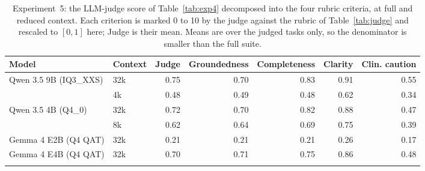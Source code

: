 \begin{table}[H]
\centering
\caption{Experiment~5: the LLM-judge score of Table~\ref{tab:exp4} decomposed into the four rubric criteria, at full and reduced context. Each criterion is marked 0 to 10 by the judge against the rubric of Table~\ref{tab:judge} and rescaled to $[0,1]$ here; Judge is their mean. Means are over the judged tasks only, so the denominator is smaller than the full suite.}
\label{tab:exp4_judge}
\small
\setlength{\tabcolsep}{5pt}
\begin{tabular}{@{}ll rrrrr@{}}
\toprule
Model & Context & Judge & Groundedness & Completeness & Clarity & Clin. caution \\
\midrule
Qwen 3.5 9B (IQ3\_XXS) & 32k & 0.75 & 0.70 & 0.83 & 0.91 & 0.55 \\
 & 4k & 0.48 & 0.49 & 0.48 & 0.62 & 0.34 \\
\addlinespace
Qwen 3.5 4B (Q4\_0) & 32k & 0.72 & 0.70 & 0.82 & 0.88 & 0.47 \\
 & 8k & 0.62 & 0.64 & 0.69 & 0.75 & 0.39 \\
\addlinespace
Gemma 4 E2B (Q4 QAT) & 32k & 0.21 & 0.21 & 0.21 & 0.26 & 0.17 \\
\addlinespace
Gemma 4 E4B (Q4 QAT) & 32k & 0.70 & 0.71 & 0.75 & 0.86 & 0.48 \\
\addlinespace
\bottomrule
\end{tabular}
\end{table}

